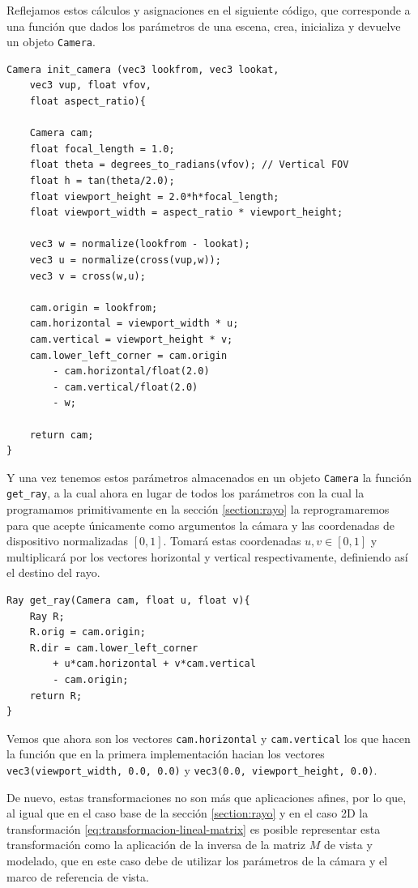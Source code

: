 Reflejamos estos cálculos y asignaciones en el siguiente código, que corresponde a una función que dados los parámetros de una escena, crea, inicializa y devuelve un objeto \verb|Camera|.
\begin{lstlisting}
Camera init_camera (vec3 lookfrom, vec3 lookat, 
    vec3 vup, float vfov, 
    float aspect_ratio){
    
    Camera cam;
    float focal_length = 1.0;
    float theta = degrees_to_radians(vfov); // Vertical FOV
    float h = tan(theta/2.0);
    float viewport_height = 2.0*h*focal_length;
    float viewport_width = aspect_ratio * viewport_height;

    vec3 w = normalize(lookfrom - lookat);
    vec3 u = normalize(cross(vup,w));
    vec3 v = cross(w,u);

    cam.origin = lookfrom;
    cam.horizontal = viewport_width * u;
    cam.vertical = viewport_height * v;
    cam.lower_left_corner = cam.origin 
        - cam.horizontal/float(2.0) 
        - cam.vertical/float(2.0)
        - w;

    return cam;
}
\end{lstlisting}

Y una vez tenemos estos parámetros almacenados en un objeto \verb|Camera| la función \verb|get_ray|, a la cual ahora en lugar de todos los parámetros con la cual la programamos primitivamente en la sección \ref{section:rayo} la reprogramaremos para que acepte únicamente como argumentos la cámara y las coordenadas de dispositivo normalizadas $[0,1]$. Tomará estas coordenadas $u,v\in[0,1]$ y multiplicará por los vectores horizontal y vertical respectivamente, definiendo así el destino del rayo.

\begin{lstlisting}
Ray get_ray(Camera cam, float u, float v){
    Ray R;
    R.orig = cam.origin;
    R.dir = cam.lower_left_corner 
        + u*cam.horizontal + v*cam.vertical 
        - cam.origin;
    return R;
}
\end{lstlisting}

Vemos que ahora son los vectores \verb|cam.horizontal| y \verb|cam.vertical| los que hacen la función que en la primera implementación hacian los vectores \verb|vec3(viewport_width, 0.0, 0.0)| y \verb|vec3(0.0, viewport_height, 0.0)|.

De nuevo, estas transformaciones no son más que aplicaciones afines, por lo que, al igual que en el caso base de la sección \ref{section:rayo} y en el caso 2D la transformación \ref{eq:transformacion-lineal-matrix} es posible representar esta transformación como la aplicación de la inversa de la matriz $M$ de vista y modelado, que en este caso debe de utilizar los parámetros de la cámara y el marco de referencia de vista. 

